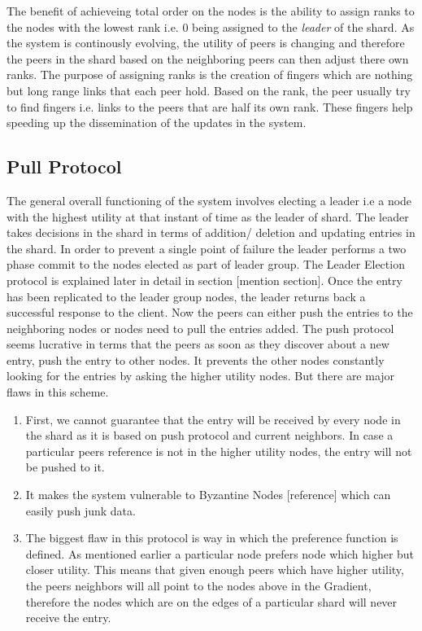 \documentclass[12pt,a4paper,twoside,openright]{book}
\begin{document}
\par The benefit of achieveing total order on the nodes is the ability to assign ranks to the nodes with the lowest rank i.e. 0 being assigned to the \textit{leader} of the shard. As the system is continously evolving, the utility of peers is changing and therefore the peers in the shard based on the neighboring peers can then adjust there own ranks. The purpose of assigning ranks is the creation of fingers which are nothing but long range links that each peer hold. Based on the rank, the peer usually try to find fingers i.e. links to the peers that are half its own rank. These fingers help speeding up the dissemination of the updates in the system.


\subsection{Pull Protocol}

The general overall functioning of the system involves electing a leader i.e a node with the highest utility at that instant of time as the leader of shard. The leader takes decisions in the shard in terms of addition/ deletion and updating entries in the shard. In order to prevent a single point of failure the leader performs a two phase commit to the nodes elected as part of leader group. The Leader Election protocol is explained later in detail in section [mention section]. Once the entry has been replicated to the leader group nodes, the leader returns back a successful response to the client. Now the peers can either push the entries to the neighboring nodes or nodes need to pull the entries added. The push protocol seems lucrative in terms that the peers as soon as they discover about a new entry, push the entry to other nodes. It prevents the other nodes constantly looking for the entries by asking the higher utility nodes. But there are major flaws in this scheme.

\begin{enumerate}

\item First, we cannot guarantee that the entry will be received by every node in the shard as it is based on push protocol and current neighbors. In case a particular peers reference is not in the higher utility nodes, the entry will not be pushed to it.

\item It makes the system vulnerable to Byzantine Nodes [reference] which can easily push junk data.

\item The biggest flaw in this protocol is way in which the preference function is defined. As mentioned earlier a particular node prefers node which higher but closer utility. This means that given enough peers which have higher utility, the peers neighbors will all point to the nodes above in the Gradient, therefore the nodes which are on the edges of a particular shard will never receive the entry.

\end{enumerate} 
\end{document}

